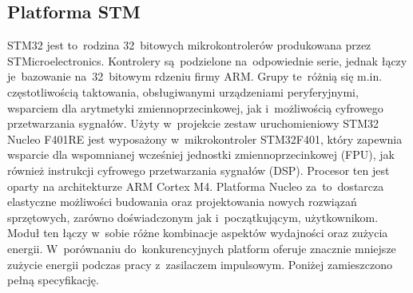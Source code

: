 \subsection{Platforma STM} \label{sec:stm}
STM32 jest to~rodzina 32~bitowych mikrokontrolerów produkowana przez STMicroelectronics.
Kontrolery są~podzielone na~odpowiednie serie, jednak łączy je~bazowanie na~32~bitowym
rdzeniu firmy ARM. Grupy te~różnią się m.in. częstotliwością taktowania, obsługiwanymi
urządzeniami peryferyjnymi, wsparciem dla arytmetyki zmiennoprzecinkowej, jak i~możliwością
cyfrowego przetwarzania sygnałów.
Użyty w~projekcie zestaw uruchomieniowy STM32 Nucleo F401RE jest wyposażony w~mikrokontroler
STM32F401, który zapewnia wsparcie dla wspomnianej wcześniej jednostki zmiennoprzecinkowej (FPU),
jak również instrukcji cyfrowego przetwarzania sygnałów (DSP). Procesor ten jest oparty na
architekturze ARM Cortex M4. Platforma Nucleo za~to~dostarcza elastyczne
możliwości budowania oraz projektowania nowych rozwiązań sprzętowych, zarówno
doświadczonym jak i~początkującym, użytkownikom. Moduł ten łączy w~sobie różne kombinacje
aspektów wydajności oraz zużycia energii. W~porównaniu do~konkurencyjnych platform oferuje
znacznie mniejsze zużycie energii podczas pracy z~zasilaczem impulsowym.
Poniżej zamieszczono pełną specyfikację. \cite{stm_ds} \cite{stm_um} \cite{stm_botland}
